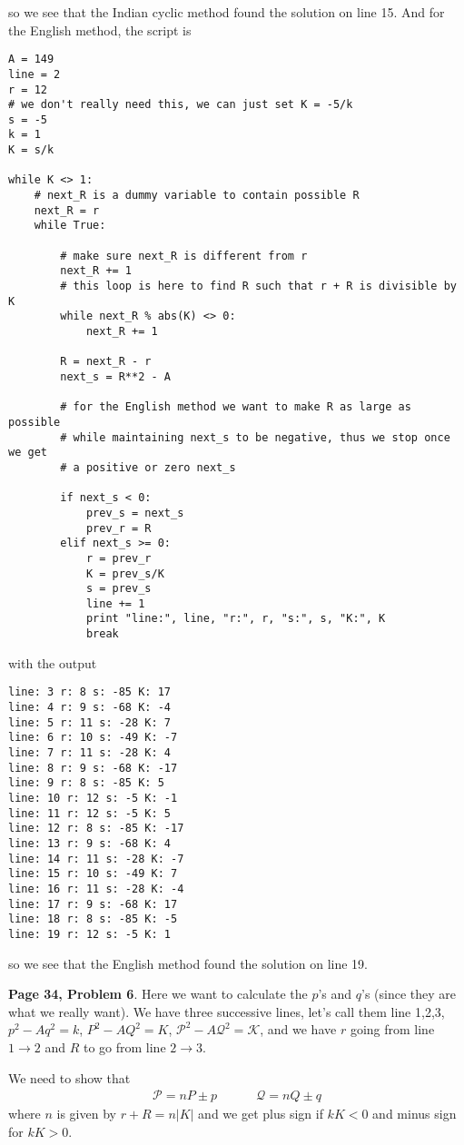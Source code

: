 \documentclass[aps,preprint,preprintnumbers,nofootinbib,showpacs,prd]{revtex4-1}
\newcommand{\nbea}{\begin{eqnarray*}}
\newcommand{\neea}{\end{eqnarray*}}
\begin{document}
%
so we see that the Indian cyclic method found the solution on line 15. And for the English method, the script is
%
\begin{Verbatim}[baselinestretch=0.75]
A = 149
line = 2
r = 12
# we don't really need this, we can just set K = -5/k
s = -5
k = 1
K = s/k

while K <> 1:
    # next_R is a dummy variable to contain possible R
    next_R = r
    while True:

        # make sure next_R is different from r
        next_R += 1
        # this loop is here to find R such that r + R is divisible by K
        while next_R % abs(K) <> 0:
            next_R += 1

        R = next_R - r
        next_s = R**2 - A

        # for the English method we want to make R as large as possible
        # while maintaining next_s to be negative, thus we stop once we get
        # a positive or zero next_s

        if next_s < 0:
            prev_s = next_s
            prev_r = R
        elif next_s >= 0:
            r = prev_r
            K = prev_s/K
            s = prev_s
            line += 1
            print "line:", line, "r:", r, "s:", s, "K:", K
            break
\end{Verbatim}
%
with the output
%
\begin{Verbatim}[baselinestretch=0.75]
line: 3 r: 8 s: -85 K: 17
line: 4 r: 9 s: -68 K: -4
line: 5 r: 11 s: -28 K: 7
line: 6 r: 10 s: -49 K: -7
line: 7 r: 11 s: -28 K: 4
line: 8 r: 9 s: -68 K: -17
line: 9 r: 8 s: -85 K: 5
line: 10 r: 12 s: -5 K: -1
line: 11 r: 12 s: -5 K: 5
line: 12 r: 8 s: -85 K: -17
line: 13 r: 9 s: -68 K: 4
line: 14 r: 11 s: -28 K: -7
line: 15 r: 10 s: -49 K: 7
line: 16 r: 11 s: -28 K: -4
line: 17 r: 9 s: -68 K: 17
line: 18 r: 8 s: -85 K: -5
line: 19 r: 12 s: -5 K: 1
\end{Verbatim}
%
so we see that the English method found the solution on line 19.

{\bf Page 34, Problem 6}. Here we want to calculate the $p$'s and $q$'s (since they are what we really want). We have three successive lines, let's call them line 1,2,3, $p^2 - Aq^2 = k$, $P^2 - AQ^2 = K$, $\mathcal{P}^2 - A\mathcal{Q}^2 = \mathcal{K}$, and we have $r$ going from line $1\to2$ and $R$ to go from line $2\to3$.

We need to show that 
%
\nbea
\mathcal{P} = nP \pm p ~~~~~~~~~~~~~~ \mathcal{Q} = nQ \pm q
\neea
%
where $n$ is given by $r + R = n|K|$ and we get plus sign if $kK < 0$ and minus sign for $kK > 0$.
\end{document}
